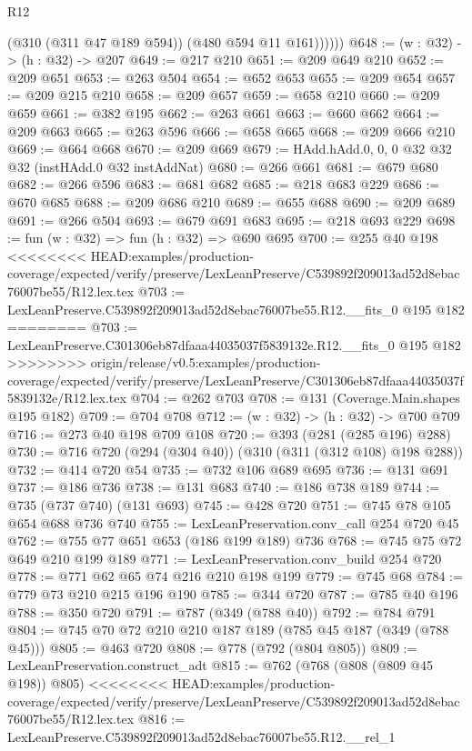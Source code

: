 \begin{lexlean}{R12}
\begin{coremodule}
{{{{{{{{              (@310 (@311 @47 @189 @594))
              (@480 @594 @11 @161))))))
@648 := (w : @32) -> (h : @32) -> @207
@649 := @217 @210
@651 := @209 @649 @210
@652 := @209 @651
@653 := @263 @504
@654 := @652 @653
@655 := @209 @654
@657 := @209 @215 @210
@658 := @209 @657
@659 := @658 @210
@660 := @209 @659
@661 := @382 @195
@662 := @263 @661
@663 := @660 @662
@664 := @209 @663
@665 := @263 @596
@666 := @658 @665
@668 := @209 @666 @210
@669 := @664 @668
@670 := @209 @669
@679 := HAdd.hAdd.{0, 0, 0} @32 @32 @32 (instHAdd.{0} @32 instAddNat)
@680 := @266 @661
@681 := @679 @680
@682 := @266 @596
@683 := @681 @682
@685 := @218 @683 @229
@686 := @670 @685
@688 := @209 @686 @210
@689 := @655 @688
@690 := @209 @689
@691 := @266 @504
@693 := @679 @691 @683
@695 := @218 @693 @229
@698 := fun (w : @32) => fun (h : @32) => @690 @695
@700 := @255 @40 @198
<<<<<<<< HEAD:examples/production-coverage/expected/verify/preserve/LexLeanPreserve/C539892f209013ad52d8ebac76007be55/R12.lex.tex
@703 := LexLeanPreserve.C539892f209013ad52d8ebac76007be55.R12.__fits_0 @195 @182
========
@703 := LexLeanPreserve.C301306eb87dfaaa44035037f5839132e.R12.__fits_0 @195 @182
>>>>>>>> origin/release/v0.5:examples/production-coverage/expected/verify/preserve/LexLeanPreserve/C301306eb87dfaaa44035037f5839132e/R12.lex.tex
@704 := @262 @703
@708 := @131 (Coverage.Main.shapes @195 @182)
@709 := @704 @708
@712 := (w : @32) -> (h : @32) -> @700 @709
@716 := @273 @40 @198 @709 @108
@720 := @393 (@281 (@285 @196) @288)
@730 := @716 @720 (@294 (@304 @40)) (@310 (@311 (@312 @108) @198 @288))
@732 := @414 @720 @54
@735 := @732 @106 @689 @695
@736 := @131 @691
@737 := @186 @736
@738 := @131 @683
@740 := @186 @738 @189
@744 := @735 (@737 @740) (@131 @693)
@745 := @428 @720
@751 := @745 @78 @105 @654 @688 @736 @740
@755 := LexLeanPreservation.conv_call @254 @720 @45
@762 := @755 @77 @651 @653 (@186 @199 @189) @736
@768 := @745 @75 @72 @649 @210 @199 @189
@771 := LexLeanPreservation.conv_build @254 @720
@778 := @771 @62 @65 @74 @216 @210 @198 @199
@779 := @745 @68
@784 := @779 @73 @210 @215 @196 @190
@785 := @344 @720
@787 := @785 @40 @196
@788 := @350 @720
@791 := @787 (@349 (@788 @40))
@792 := @784 @791
@804 := @745 @70 @72 @210 @210 @187 @189 (@785 @45 @187 (@349 (@788 @45)))
@805 := @463 @720
@808 := @778 (@792 (@804 @805))
@809 := LexLeanPreservation.construct_adt
@815 := @762 (@768 (@808 (@809 @45 @198)) @805)
<<<<<<<< HEAD:examples/production-coverage/expected/verify/preserve/LexLeanPreserve/C539892f209013ad52d8ebac76007be55/R12.lex.tex
@816 := LexLeanPreserve.C539892f209013ad52d8ebac76007be55.R12.__rel_1
}}}}}}}}
\end{coremodule}
\end{lexlean}
